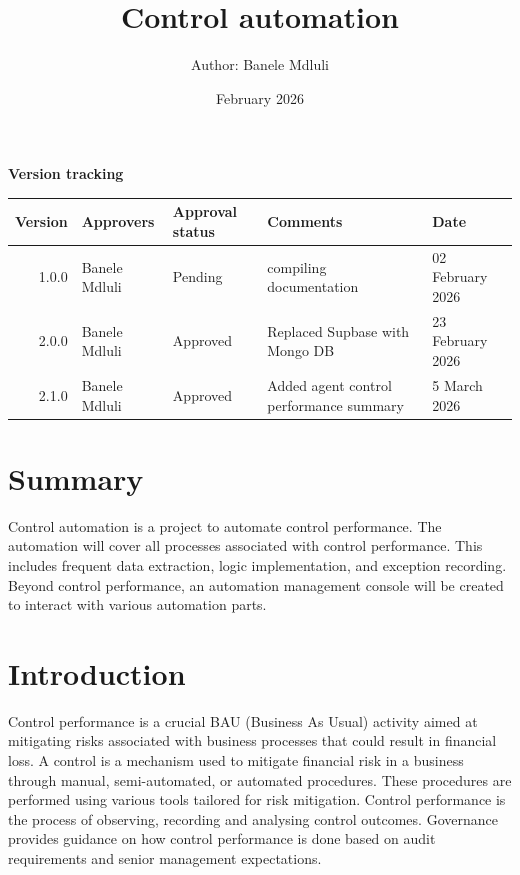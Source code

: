 \documentclass{article}
\title{Control automation}
\author{Author: Banele Mdluli}
\date{February 2026}
\begin{document}
\maketitle
\newpage
\begin{titlepage}
    \centering
    \vspace*{1cm}
    
    {\Huge\bfseries Version tracking\par}
    \vspace{2cm}
    
    \begin{tabular}{|r|l|l|p{4cm}|l|}
        \hline
        \textbf{Version} & \textbf{Approvers} & \textbf{Approval status} & \textbf{Comments} &\textbf{Date} \\
        \hline
          1.0.0 & Banele Mdluli & Pending & compiling documentation & 02 February 2026\\
        \hline
          2.0.0 & Banele Mdluli & Approved & Replaced Supbase with Mongo DB & 23 February 2026\\
        \hline
          2.1.0 & Banele Mdluli & Approved & Added agent control performance summary & 5 March 2026\\
        \hline
    \end{tabular}
    
    \vfill
    
\end{titlepage}
\newpage

\section{Summary}
Control automation is a project to automate control performance. The automation will cover all processes associated with control performance. This includes frequent data extraction, logic implementation, and exception recording. Beyond control performance, an automation management console will be created to interact with various automation parts.

\section{Introduction}
Control performance is a crucial BAU (Business As Usual) activity aimed at mitigating risks associated with business processes that could result in financial loss. A control is a mechanism used to mitigate financial risk in a business through manual, semi-automated, or automated procedures. These procedures are performed using various tools tailored for risk mitigation. Control performance is the process of observing, recording and analysing control outcomes. Governance provides guidance on how control performance is done based on audit requirements and senior management expectations.
\end{document}
